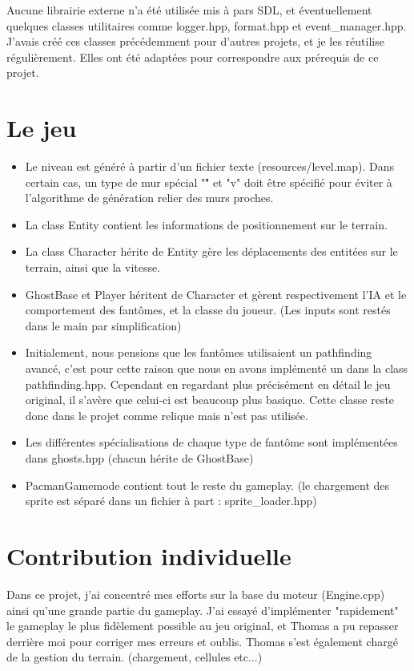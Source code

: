 \documentclass [twoside,a4paper,11pt,french] {report}
\begin{document}
    Aucune librairie externe n'a été utilisée mis à pars SDL, et éventuellement quelques classes utilitaires 
    comme logger.hpp, format.hpp et event\_manager.hpp. J'avais créé ces classes précédemment pour d'autres projets,
    et je les réutilise régulièrement. Elles ont été adaptées pour correspondre aux prérequis de ce projet.

\section{Le jeu}
    \begin{itemize}
        \item Le niveau est généré à partir d'un fichier texte (resources/level.map).
        Dans certain cas, un type de mur spécial "\^" et "v" doit être spécifié pour éviter à l'algorithme
        de génération relier des murs proches.
        \item La class Entity contient les informations de positionnement sur le terrain.
        \item La class Character hérite de Entity gère les déplacements des entitées sur le terrain, ainsi que la vitesse.
        \item GhostBase et Player héritent de Character et gèrent respectivement l'IA et le comportement des fantômes, et 
        la classe du joueur. (Les inputs sont restés dans le main par simplification)
        \item Initialement, nous pensions que les fantômes utilisaient un pathfinding avancé, c'est pour cette raison que nous
        en avons implémenté un dans la class pathfinding.hpp. Cependant en regardant plus précisément en détail le jeu original,
        il s'avère que celui-ci est beaucoup plus basique. Cette classe reste donc dans le projet comme relique mais n'est pas utilisée.
        \item Les différentes spécialisations de chaque type de fantôme sont implémentées dans ghosts.hpp (chacun hérite de GhostBase)
        \item PacmanGamemode contient tout le reste du gameplay. (le chargement des sprite est séparé dans un fichier à part : sprite\_loader.hpp)
    \end{itemize}

\section{Contribution individuelle}

    Dans ce projet, j'ai concentré mes efforts sur la base du moteur (Engine.cpp) ainsi qu'une grande partie du gameplay.
    J'ai essayé d'implémenter "rapidement" le gameplay le plus fidèlement possible au jeu original, et Thomas a pu repasser derrière moi
    pour corriger mes erreurs et oublis. Thomas s'est également chargé de la gestion du terrain. (chargement, cellules etc...)
\end{document}
